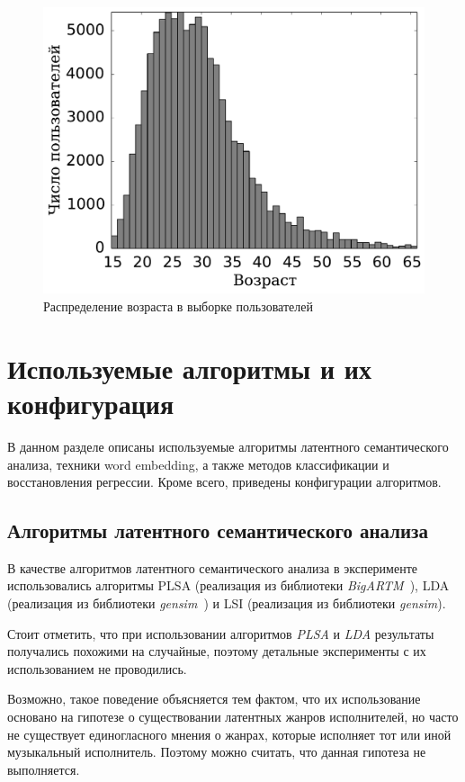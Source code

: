 \begin{figure}[!h]
\caption{Распределение возраста в выборке пользователей}
\label{fig:age_histogram}
\centering
\includegraphics[scale=0.60]{figs/age-histogram.pdf}
\end{figure}

\section{Используемые алгоритмы и их конфигурация}
\label{sec:algorithms_config}

В данном разделе описаны используемые алгоритмы латентного
семантического анализа, техники word embedding, а также методов
классификации и восстановления регрессии. Кроме всего, приведены
конфигурации алгоритмов.

\subsection{Алгоритмы латентного семантического анализа}

В качестве алгоритмов латентного семантического анализа
в эксперименте использовались алгоритмы PLSA (реализация из библиотеки
\textit{BigARTM}~\cite{bigartm}), LDA (реализация из библиотеки
\textit{gensim}~\cite{gensim}) и LSI (реализация из библиотеки
\textit{gensim}).

Стоит отметить, что при использовании алгоритмов
\textit{PLSA} и \textit{LDA} результаты получались похожими 
на случайные, поэтому детальные эксперименты с их 
использованием не проводились. 

Возможно, такое поведение объясняется тем фактом, 
что их использование основано на гипотезе о существовании 
латентных жанров исполнителей, но часто не существует единогласного 
мнения о жанрах, которые исполняет тот или иной музыкальный исполнитель.
Поэтому можно считать, что данная гипотеза не выполняется.

